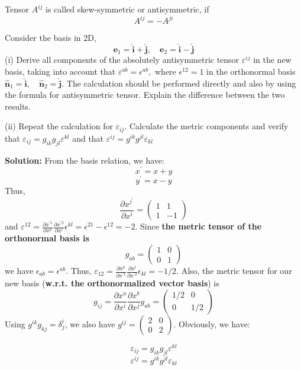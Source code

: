 Tensor $A^{i j}$ is called skew-symmetric or antisymmetric, if
\begin{equation}
A^{i j}=-A^{j i}
\end{equation}
\begin{example}
Consider the basis in 2D,
$$
\mathbf{e}_{1}=\hat{\mathbf{i}}+\hat{\mathbf{j}}, \quad \mathbf{e}_{2}=\hat{\mathbf{i}}-\hat{\mathbf{j}}
$$
(i) Derive all components of the absolutely antisymmetric tensor $\varepsilon^{i j}$ in the new basis, taking into account that $\varepsilon^{a b}=\epsilon^{a b},$ where $\epsilon^{12}=1$ in the orthonormal basis $\hat{\mathbf{n}}_{1}=\hat{\mathbf{i}}, \quad \hat{\mathbf{n}}_{2}=\hat{\mathbf{j}} .$ The calculation should be performed directly and also by using the formula for antisymmetric tensor. Explain the difference between the two results. 

(ii) Repeat the calculation for $\varepsilon_{i j} .$ Calculate the metric components and verify that $\varepsilon_{i j}=g_{i k} g_{j l} \varepsilon^{k l}$ and that $\varepsilon^{i j}=g^{i k} g^{j l} \varepsilon_{k l}$

\end{example}
\textbf{Solution:}
From the basis relation, we have:
$$
x^{\prime}=x+y
$$
$$
y^{\prime}=x-y
$$
Thus, 
$$
\frac{\partial x^{j^{\prime}}}{\partial x^i}=\left(\begin{array}{cc}
{1} & {1}\\
{1} & {-1}
\end{array}\right)
$$
and $\varepsilon^{12}=\frac{\partial x^{\prime 1}}{\partial x^k}\frac{\partial x^{\prime 2}}{\partial x^l}\epsilon^{kl}=\epsilon^{21}-\epsilon^{12}=-2$. Since \textbf{the metric tensor of the orthonormal basis is}
$$
g_{ab}=\left(\begin{array}{cc}
{1} & {0}\\
{0} & {1}
\end{array}\right)
$$
we have $\epsilon_{ab}=\epsilon^{ab}$. Thus, $\varepsilon_{12}=\frac{\partial x^k}{\partial x^{\prime 1}}\frac{\partial x^l}{\partial x^{\prime 2}}\epsilon_{kl}=-1/2$. Also, the metric tensor for our new basis (\textbf{w.r.t. the orthonormalized vector basis}) is
$$
g_{ij}=\frac{\partial x^{a}}{\partial x^i}\frac{\partial x^{b}}{\partial x^j}g_{ab}=\left(\begin{array}{cc}
{1/2} & {0}\\
{0} & {1/2}
\end{array}\right)
$$
Using $g^{i k} g_{k j}=\delta_{j}^{i}$, we also have $g^{ij}=\left(\begin{array}{cc}
{2} & {0}\\{0} & {2}\end{array}\right)$. Obviously, we have:
\begin{qt}
$$
\varepsilon_{i j}=g_{i k} g_{j l} \varepsilon^{k l}
$$
$$
\varepsilon^{i j}=g^{i k} g^{j l} \varepsilon_{k l}
$$
\end{qt}

